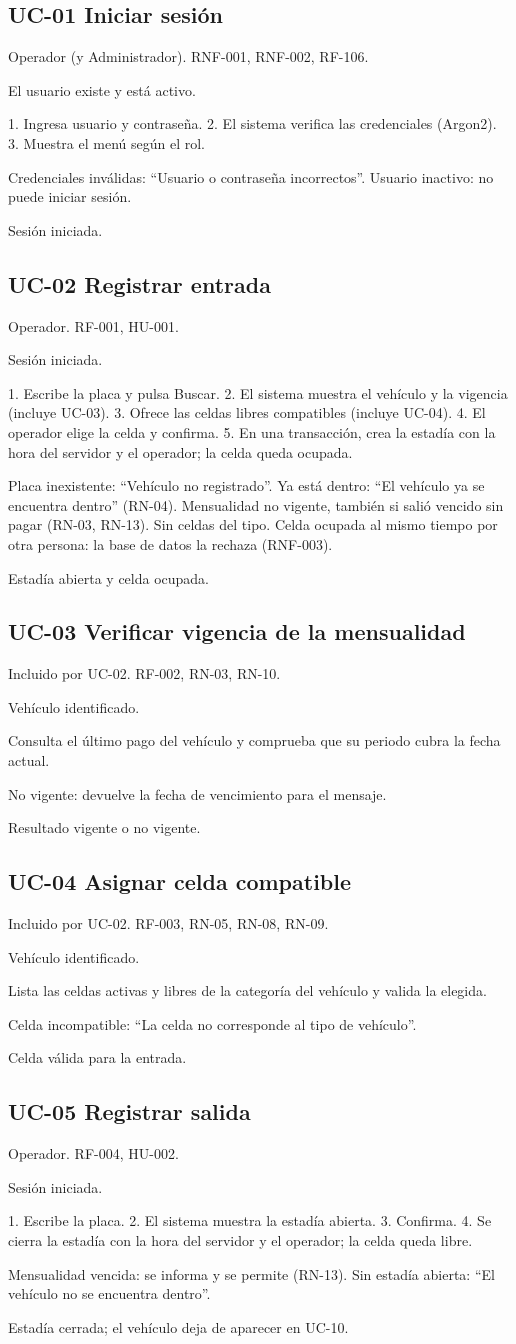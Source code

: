 \newcommand{\casouso}[6]{%
  \subsection{#1}
  \begin{description}[style=nextline]
    \item[Actor y trazabilidad] #2
    \item[Precondición] #3
    \item[Flujo principal] #4
    \item[Alternativos y excepciones] #5
    \item[Postcondición] #6
  \end{description}}

\casouso{UC-01 Iniciar sesión}{Operador (y Administrador). RNF-001, RNF-002, RF-106.}{El usuario existe y está activo.}{1. Ingresa usuario y contraseña. 2. El sistema verifica las credenciales (Argon2). 3. Muestra el menú según el rol.}{Credenciales inválidas: ``Usuario o contraseña incorrectos''. Usuario inactivo: no puede iniciar sesión.}{Sesión iniciada.}

\casouso{UC-02 Registrar entrada}{Operador. RF-001, HU-001.}{Sesión iniciada.}{1. Escribe la placa y pulsa Buscar. 2. El sistema muestra el vehículo y la vigencia (incluye UC-03). 3. Ofrece las celdas libres compatibles (incluye UC-04). 4. El operador elige la celda y confirma. 5. En una transacción, crea la estadía con la hora del servidor y el operador; la celda queda ocupada.}{Placa inexistente: ``Vehículo no registrado''. Ya está dentro: ``El vehículo ya se encuentra dentro'' (RN-04). Mensualidad no vigente, también si salió vencido sin pagar (RN-03, RN-13). Sin celdas del tipo. Celda ocupada al mismo tiempo por otra persona: la base de datos la rechaza (RNF-003).}{Estadía abierta y celda ocupada.}

\casouso{UC-03 Verificar vigencia de la mensualidad}{Incluido por UC-02. RF-002, RN-03, RN-10.}{Vehículo identificado.}{Consulta el último pago del vehículo y comprueba que su periodo cubra la fecha actual.}{No vigente: devuelve la fecha de vencimiento para el mensaje.}{Resultado vigente o no vigente.}

\casouso{UC-04 Asignar celda compatible}{Incluido por UC-02. RF-003, RN-05, RN-08, RN-09.}{Vehículo identificado.}{Lista las celdas activas y libres de la categoría del vehículo y valida la elegida.}{Celda incompatible: ``La celda no corresponde al tipo de vehículo''.}{Celda válida para la entrada.}

\casouso{UC-05 Registrar salida}{Operador. RF-004, HU-002.}{Sesión iniciada.}{1. Escribe la placa. 2. El sistema muestra la estadía abierta. 3. Confirma. 4. Se cierra la estadía con la hora del servidor y el operador; la celda queda libre.}{Mensualidad vencida: se informa y se permite (RN-13). Sin estadía abierta: ``El vehículo no se encuentra dentro''.}{Estadía cerrada; el vehículo deja de aparecer en UC-10.}

